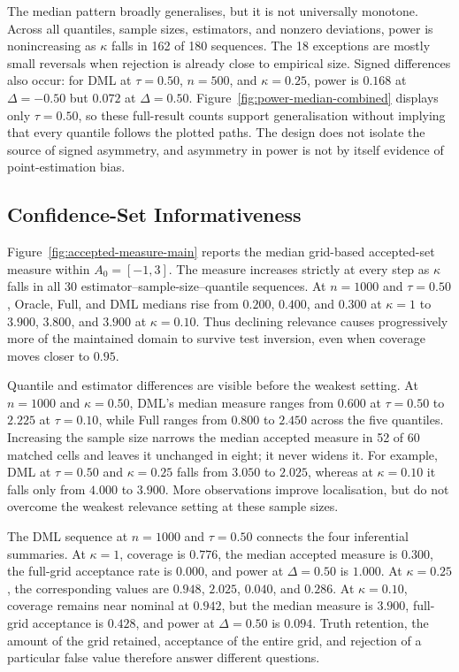 The median pattern broadly generalises, but it is not universally monotone. Across all quantiles, sample sizes, estimators, and nonzero deviations, power is nonincreasing as $\kappa$ falls in 162 of 180 sequences. The 18 exceptions are mostly small reversals when rejection is already close to empirical size. Signed differences also occur: for DML at $\tau=0.50$, $n=500$, and $\kappa=0.25$, power is $0.168$ at $\Delta=-0.50$ but $0.072$ at $\Delta=0.50$. Figure~\ref{fig:power-median-combined} displays only $\tau=0.50$, so these full-result counts support generalisation without implying that every quantile follows the plotted paths. The design does not isolate the source of signed asymmetry, and asymmetry in power is not by itself evidence of point-estimation bias.

\FloatBarrier

\subsection{Confidence-Set Informativeness}
\label{sec:results-informativeness}

Figure~\ref{fig:accepted-measure-main} reports the median grid-based accepted-set measure within $A_0=[-1,3]$. The measure increases strictly at every step as $\kappa$ falls in all 30 estimator--sample-size--quantile sequences. At $n=1000$ and $\tau=0.50$, Oracle, Full, and DML medians rise from $0.200$, $0.400$, and $0.300$ at $\kappa=1$ to $3.900$, $3.800$, and $3.900$ at $\kappa=0.10$. Thus declining relevance causes progressively more of the maintained domain to survive test inversion, even when coverage moves closer to $0.95$.



Quantile and estimator differences are visible before the weakest setting. At $n=1000$ and $\kappa=0.50$, DML's median measure ranges from $0.600$ at $\tau=0.50$ to $2.225$ at $\tau=0.10$, while Full ranges from $0.800$ to $2.450$ across the five quantiles. Increasing the sample size narrows the median accepted measure in 52 of 60 matched cells and leaves it unchanged in eight; it never widens it. For example, DML at $\tau=0.50$ and $\kappa=0.25$ falls from $3.050$ to $2.025$, whereas at $\kappa=0.10$ it falls only from $4.000$ to $3.900$. More observations improve localisation, but do not overcome the weakest relevance setting at these sample sizes.

The DML sequence at $n=1000$ and $\tau=0.50$ connects the four inferential summaries. At $\kappa=1$, coverage is $0.776$, the median accepted measure is $0.300$, the full-grid acceptance rate is $0.000$, and power at $\Delta=0.50$ is $1.000$. At $\kappa=0.25$, the corresponding values are $0.948$, $2.025$, $0.040$, and $0.286$. At $\kappa=0.10$, coverage remains near nominal at $0.942$, but the median measure is $3.900$, full-grid acceptance is $0.428$, and power at $\Delta=0.50$ is $0.094$. Truth retention, the amount of the grid retained, acceptance of the entire grid, and rejection of a particular false value therefore answer different questions.


